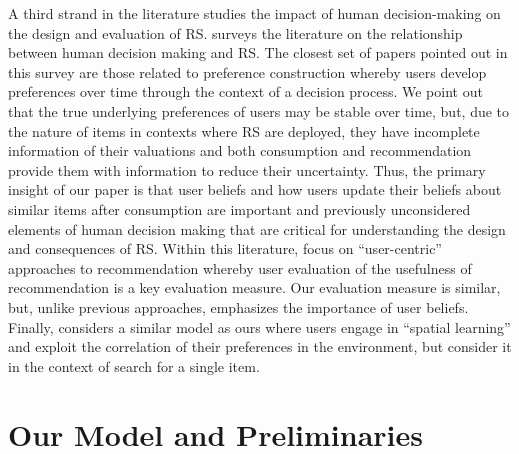 \documentclass[manuscript, nonacm]{acmart}
\begin{document}
A third strand in the literature studies the impact of human decision-making on the design and evaluation of RS. \cite{chen2013human} surveys the literature on the relationship between human decision making and RS. The closest set of papers pointed out in this survey are those related to preference construction \cite{bettman1998constructive, lichtenstein2006construction} whereby users develop preferences over time through the context of a decision process. We point out that the true underlying preferences of users may be stable over time, but, due to the nature of items in contexts where RS are deployed, they have incomplete information of their valuations and both consumption and recommendation provide them with information to reduce their uncertainty. Thus, the primary insight of our paper is that user beliefs and how users update their beliefs about similar items after consumption are important and previously unconsidered elements of human decision making that are critical for understanding the design and consequences of RS. Within this literature, \cite{celma2008new, cremonesi2013user, pu2011user} focus on ``user-centric'' approaches to recommendation whereby user evaluation of the usefulness of recommendation is a key evaluation measure. Our evaluation measure is similar, but, unlike previous approaches, emphasizes the importance of user beliefs. Finally, \cite{hodgson2019horse} considers a similar model as ours where users engage in ``spatial learning'' and exploit the correlation of their preferences in the environment, but consider it in the context of search for a single item.

\section{Our Model and Preliminaries}
\end{document}
